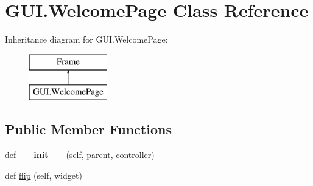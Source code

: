 \hypertarget{class_g_u_i_1_1_welcome_page}{}\section{G\+U\+I.\+Welcome\+Page Class Reference}
\label{class_g_u_i_1_1_welcome_page}
Inheritance diagram for G\+U\+I.\+Welcome\+Page\+:\begin{figure}[H]
\begin{center}
\leavevmode
\includegraphics[height=2.000000cm]{class_g_u_i_1_1_welcome_page}
\end{center}
\end{figure}
\subsection*{Public Member Functions}
\begin{DoxyCompactItemize}
\item 
\mbox{\label{class_g_u_i_1_1_welcome_page_aa88665446973a13fe29a978a1a9962e3}} 
def {\bfseries \+\_\+\+\_\+init\+\_\+\+\_\+} (self, parent, controller)
\item 
def \mbox{\hyperlink{class_g_u_i_1_1_welcome_page_a7612699922f2f3789aa58e098797b949}{flip}} (self, widget)
\end{DoxyCompactItemize}
